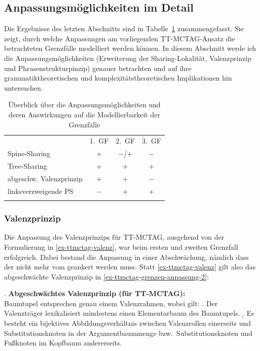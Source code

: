 \subsection{Anpassungsmöglichkeiten im Detail} \label{sec-ttmctag-grenzen-anpassung}

Die Ergebnisse des letzten Abschnitts sind in Tabelle~\ref{tab-ttmctag-grenzen-anpassung-1} zusammengefasst. Sie zeigt, durch welche Anpassungen am vorliegenden TT-MCTAG-Ansatz die betrachteten Grenzfälle modelliert werden können. In diesem Abschnitt werde ich die Anpassungsmöglichkeiten (Erweiterung der Sharing-Lokalität, Valenzprinzip und Phrasenstrukturpinzip) genauer betrachten und auf ihre grammatiktheoretischen und komplexitätstheoretischen Implikationen hin untersuchen. 

\begin{table}[ht]
\centering
\begin{tabular}{lccc}
\lsptoprule
 & 1.~GF & 2.~GF & 3.~GF \\
\cmidrule{2-4}
Spine-Sharing & + & $-$/+ & $-$ \\ 
Tree-Sharing & + & + & + \\
abgeschw. Valenzprinzip & + & + & $-$ \\
linksverzweigende PS & $-$ & + & + \\
\lspbottomrule
\end{tabular}
\caption{\label{tab-ttmctag-grenzen-anpassung-1}Überblick über die Anpassungsmöglichkeiten und deren Auswirkungen auf die Modellierbarkeit der Grenzfälle}
\end{table}



\subsubsection*{Valenzprinzip}

Die Anpassung des Valenzprinzips für TT-MCTAG, ausgehend von der Formulierung in \ref{ex-ttmctag-valenz}, war beim ersten und zweiten Grenzfall erfolgreich. Dabei bestand die Anpassung in einer Abschwächung, nämlich dass der  nicht mehr vom  geankert werden muss. Statt \ref{ex-ttmctag-valenz} gilt also das ab\-ge\-schwäch\-te Valenzprinzip in \ref{ex-ttmctag-grenzen-anpassung-2}:

\ex. {\bf Abgeschwächtes Valenzprinzip (für TT-MCTAG):}\label{ex-ttmctag-grenzen-anpassung-2}\\
Baumtupel entsprechen genau einem Valenzrahmen, wobei gilt:
\a. Der Valenzträger lexikalisiert mindestens einen Elementarbaum des Baumtupels.
\b. Es besteht ein bijektives Abbildungsverhältnis zwischen Valenzrollen einerseits und Substitutionsknoten in der Argumentbaummenge bzw.\ Substitutionsknoten und Fu\ss knoten im Kopfbaum andererseits.

